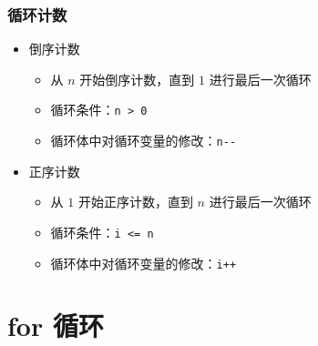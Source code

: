 \begin{frame}[fragile]
    \frametitle{循环计数}

    \begin{itemize}
        \item<1-> 倒序计数

            \begin{itemize}
                \item 从 $n$ 开始倒序计数，直到 $1$ 进行最后一次循环
                \item 循环条件：\lstinline|n > 0|
                \item 循环体中对循环变量的修改：\lstinline|n--|
            \end{itemize}

        \item<2-> 正序计数

            \begin{itemize}
                \item 从 $1$ 开始正序计数，直到 $n$ 进行最后一次循环
                \item 循环条件：\lstinline|i <= n|
                \item 循环体中对循环变量的修改：\lstinline|i++|
            \end{itemize}

    \end{itemize}
\end{frame}


\section{for 循环}

